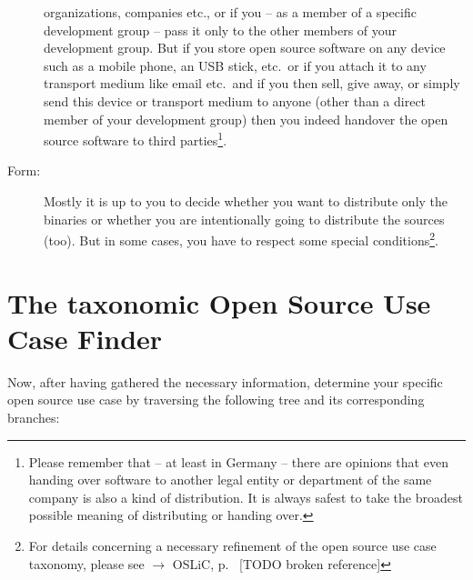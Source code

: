 \begin{description}
organizations, companies etc., or if you -- as a member of a specific
development group -- pass it only to the other members of your development
group. But if you store open source software on any device such as a mobile
phone, an USB stick, etc.\ or if you attach it to any transport medium like
email etc.\ and if you then sell, give away, or simply send this device or
transport medium to anyone (other than a direct member of your development
group) then you indeed handover the open source software to third
parties\footnote{Please remember that -- at least in Germany -- there are
opinions that even handing over software to another legal entity or department
of the same company is also a kind of distribution. It is always safest to take
the broadest possible meaning of distributing or handing over.}.
\item[Form:] Mostly it is up to you to decide whether you want to distribute
only the binaries or whether you are intentionally going to distribute the
sources (too). But in some cases, you have to respect some special
conditions\footnote{For details concerning a necessary refinement of the open
source use case taxonomy, please see $\rightarrow$ OSLiC, p.\
\pageref{sec:SourceBinaryDifference} [TODO broken reference]}.
\end{description}

\section{The taxonomic Open Source Use Case Finder}

Now, after having gathered the necessary information, determine your specific
open source use case by traversing the following tree and its corresponding
branches:


